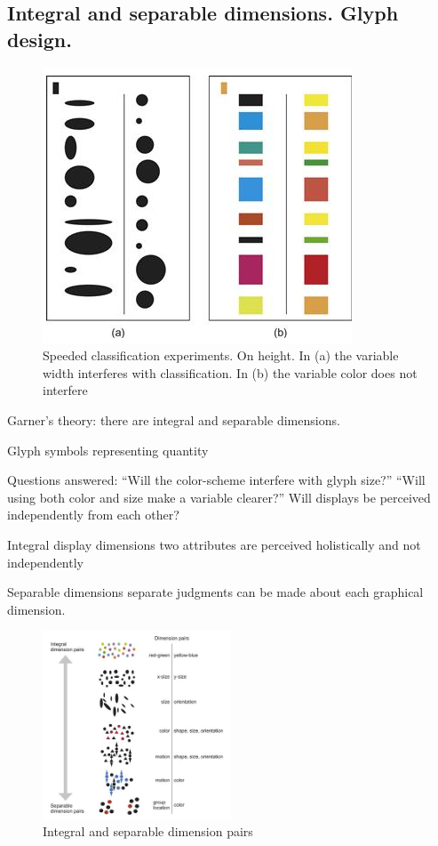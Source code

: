 \begin{mdframed}\begin{multicols}{2}
\subsection{Integral and separable dimensions. Glyph design.}

    \begin{figure}[H]
        \centering
        \includegraphics[width=0.5\linewidth]{speeded_classification.png}
        \caption{Speeded classification experiments. On height. In (a) the
        variable width interferes with classification. In (b) the variable
        color does not interfere}
    \end{figure}
\begin{compactdesc}
    \item[Garner's theory:] there are integral and separable dimensions.
    \item[Glyph] symbols representing quantity
    \item[Questions answered:]
        ``Will the color-scheme interfere with glyph size?''
        ``Will using both color and size make a variable clearer?''
        Will displays be perceived independently from each other?
    \item[Integral display dimensions] two attributes are perceived
        holistically and not independently
    \item[Separable dimensions] separate judgments can be made about
        each graphical dimension.
\end{compactdesc}
    \begin{figure}[H]
        \centering
        \includegraphics[width=0.5\textwidth]{integral_separable.png}
        \caption{Integral and separable dimension pairs}
    \end{figure}

\end{multicols}
\end{mdframed}



